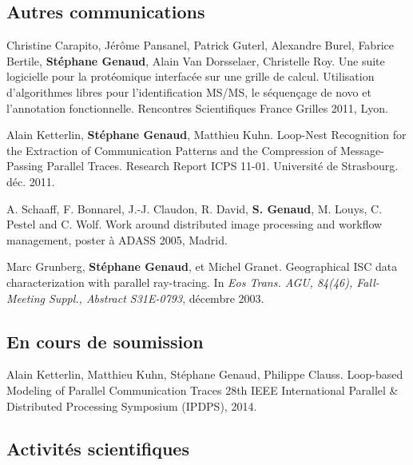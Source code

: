 \documentclass[11pt]{article}
\begin{document}
\begin{thebibliography}{99}
\subsection*{Autres communications}

Christine Carapito, Jérôme Pansanel, Patrick Guterl, Alexandre Burel, Fabrice 
Bertile, \textbf{Stéphane Genaud}, Alain Van Dorsselaer, Christelle Roy.
\newblock Une suite logicielle pour la protéomique interfacée sur une grille de 
calcul. Utilisation d'algorithmes libres pour l'identification MS/MS, le 
séquençage de novo et l'annotation fonctionnelle.
\newblock Rencontres Scientifiques France Grilles 2011, Lyon.


Alain Ketterlin, \textbf{Stéphane Genaud}, Matthieu Kuhn.
\newblock Loop-Nest Recognition for the Extraction of Communication Patterns 
and the Compression of Message-Passing Parallel Traces.
\newblock Research Report ICPS 11-01. Université de Strasbourg. déc. 2011.


A. Schaaff, F. Bonnarel, J.-J. Claudon, R. David, \textbf{S. Genaud}, M. Louys, 
C. Pestel and C. Wolf.
\newblock Work around distributed image processing and workflow management, 
\newblock poster à ADASS 2005, Madrid.


Marc Grunberg, \textbf{Stéphane Genaud}, et Michel Granet.
\newblock Geographical {ISC} data characterization with parallel ray-tracing.
\newblock In {\em Eos Trans. AGU, 84(46), Fall-Meeting Suppl., Abstract
  S31E-0793}, décembre 2003.


\subsection*{En cours de soumission}


Alain Ketterlin, Matthieu Kuhn, Stéphane Genaud, Philippe Clauss.
\newblock Loop-based Modeling of Parallel Communication Traces
\newblock 28th IEEE International Parallel \& Distributed Processing Symposium (IPDPS),
2014.

\end{thebibliography}


\newpage
\subsectionfont{\sectionrule{3ex}{0pt}{-1ex}{1pt}}



\subsection{Activités scientifiques}
\end{document}
